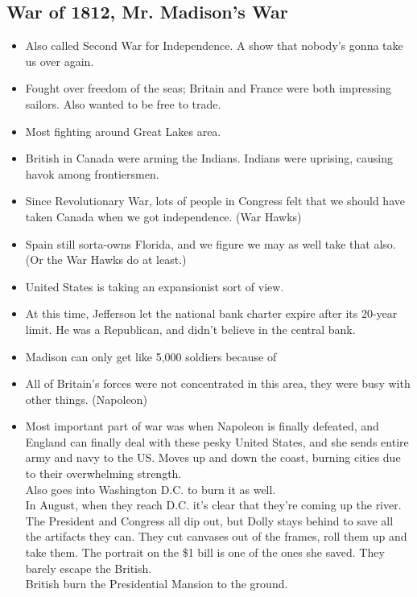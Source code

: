 \documentclass{article}
\begin{document}
    \subsection{War of 1812, Mr. Madison's War}
      \begin{itemize}
        \item Also called Second War for Independence. A show that nobody's gonna take us over again.
        \item Fought over freedom of the seas; Britain and France were both impressing sailors. Also wanted to be free to trade.
        \item Most fighting around Great Lakes area.
        \item British in Canada were arming the Indians. Indians were uprising, causing havok among frontiersmen.
        \item Since Revolutionary War, lots of people in Congress felt that we should have taken Canada when we got independence. (War Hawks)
        \item Spain still sorta-owns Florida, and we figure we may as well take that also. (Or the War Hawks do at least.)
        \item United States is taking an expansionist sort of view.
        \item At this time, Jefferson let the national bank charter expire after its 20-year limit. He was a Republican, and didn't believe in the central bank. 
        \item Madison can only get like 5,000 soldiers because of 
        \item All of Britain's forces were not concentrated in this area, they were busy with other things. (Napoleon)
        \item Most important part of war was when Napoleon is finally defeated, and England can finally deal with these pesky United States, and she sends entire army and navy to the US. Moves up and down the coast, burning cities due to their overwhelming strength. \\
        Also goes into Washington D.C. to burn it as well. \\
        In August, when they reach D.C. it's clear that they're coming up the river. The President and Congress all dip out, but Dolly stays behind to save all the artifacts they can. They cut canvases out of the frames, roll them up and take them. The portrait on the \$1 bill is one of the ones she saved. They barely escape the British. \\
        British burn the Presidential Mansion to the ground.

\end{itemize}
\end{document}
